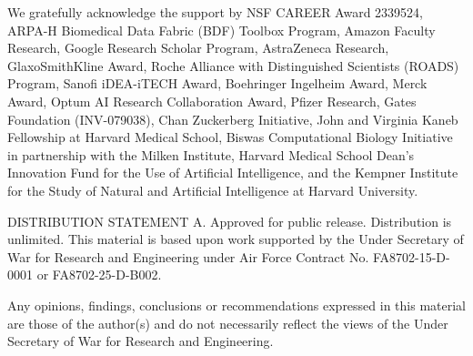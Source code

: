 \documentclass{article}
\theoremstyle{plain}
\theoremstyle{definition}
\theoremstyle{remark}
\begin{document}
We gratefully acknowledge the support by NSF CAREER Award 2339524, ARPA-H Biomedical Data Fabric (BDF) Toolbox Program, Amazon Faculty Research, Google Research Scholar Program, AstraZeneca Research, GlaxoSmithKline Award, Roche Alliance with Distinguished Scientists (ROADS) Program, Sanofi iDEA-iTECH Award, Boehringer Ingelheim Award, Merck Award, Optum AI Research Collaboration Award, Pfizer Research, Gates Foundation (INV-079038), Chan Zuckerberg Initiative, John and Virginia Kaneb Fellowship at Harvard Medical School, Biswas Computational Biology Initiative in partnership with the Milken Institute, Harvard Medical School Dean’s Innovation Fund for the Use of Artificial Intelligence, and the Kempner Institute for the Study of Natural and Artificial Intelligence at Harvard University. 

DISTRIBUTION STATEMENT A. Approved for public release. Distribution is unlimited. This material is based upon work supported by the Under Secretary of War for Research and Engineering under Air Force Contract No. FA8702-15-D-0001 or FA8702-25-D-B002. 

Any opinions, findings, conclusions or recommendations expressed in this material are those of the author(s) and do not necessarily reflect the views of the Under Secretary of War for Research and Engineering.




\newpage
\appendix
\onecolumn

\end{document}
